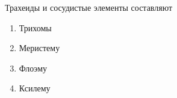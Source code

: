 
Трахеиды и сосудистые элементы составляют

\begin{enumerate}
    \item Трихомы
    \item Меристему
    \item Флоэму
    \item Ксилему
\end{enumerate}

\explanationSection

